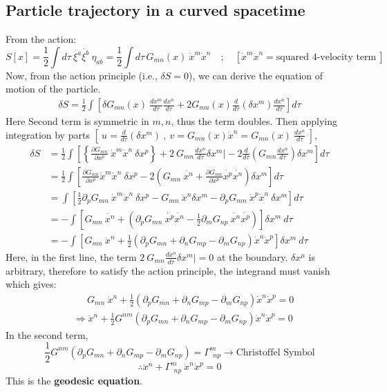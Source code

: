 \documentclass[14pt]{article} %
\begin{document}
\subsection{Particle trajectory in a curved spacetime}
From the action:
\[
S[x] = \frac{1}{2} \int d\tau ~\dot{\xi^a}\dot{\xi^b}~ \eta_{ab}
= \frac{1}{2} \int d\tau\, G_{mn}(x) ~\dot{x}^m \dot{x}^n
\quad;\quad [\dot{x}^m \dot{x}^n =\text{squared 4-velocity term} ~]
\]
\noindent
Now, from the action principle (i.e., $\delta S = 0$), we can derive the equation of motion of the particle.
\begin{align*}
\delta S = \frac{1}{2} \int \left[ \delta G_{mn}(x)~ \frac{dx^m}{d \tau} \frac{dx^n}{d \tau} + 2 G_{mn}(x) \frac{d}{d\tau} (\delta x^m) \frac{dx^n}{d \tau} \right] d\tau
\end{align*}
Here Second term is symmetric in $m,n$, thus the term doubles. Then applying integration by parts $\left[~ u=\frac{d}{d\tau} (\delta x^m)~,~v=G_{mn}(x) \dot{x}^n=G_{mn}(x) ~\frac{dx^n}{d\tau} ~\right]$,
\begin{align*}
\delta S &= \frac{1}{2} \int \left[ \left\{\frac{\partial G_{mn}}{\partial x^p}~\dot{x}^m \dot{x}^n~\delta x^p \right\} + 2~G_{mn} \frac{dx^n}{d\tau} \delta x^m\Bigg| -2 \frac{d}{d\tau}\left(G_{mn}\frac{dx^n}{d\tau}\right)\delta x^m \right] d\tau \\
&= \frac{1}{2} \int \left[ \frac{\partial G_{mn}}{\partial x^p} \dot{x}^m \dot{x}^n~\delta x^p -2 \left(G_{mn}~\ddot{x^n}+\frac{\partial G_{mn}}{\partial x^p} \dot{x^p}\dot{x^n}  \right)\delta x^m \right] d\tau \\
&= \int \left[ \frac{1}{2}\partial_p G_{mn}~\dot{x}^m \dot{x}^n~\delta x^p - G_{mn}~\ddot{x}^n \delta x^m - \partial_p G_{mn}~\dot{x}^p \dot{x}^n~\delta x^m  \right] d\tau \\
&= -\int \left[ G_{mn}~\ddot{x^n} + \left( \partial_p G_{mn}~\dot{x^p}\dot{x^n} - \frac{1}{2}\partial_m G_{np}~\dot{x^n} \dot{x^p} \right) \right] \delta x^m~d\tau  \\
&= - \int \left[ G_{mn}~\ddot{x}^n + \frac{1}{2} \left( \partial_p G_{mn} + \partial_n G_{mp} - \partial_m G_{np} \right) \dot{x}^n \dot{x}^p \right] \delta x^m~d \tau
\end{align*}
Here, in the first line, the term $2~G_{mn} \frac{dx^n}{d\tau} \delta x^m\Bigg|=0$ at the boundary. $\delta x^\mu$ is arbitrary, therefore to satisfy the action principle, the integrand must vanish which gives:
\begin{align*}
&\quad ~~ G_{mn}~\ddot{x}^n + \frac{1}{2} \left( \partial_p G_{mn} + \partial_n G_{mp} - \partial_m G_{np} \right) \dot{x}^n \dot{x}^p = 0 \\
& \Rightarrow \ddot{x}^n + \frac{1}{2}G^{nm} \left( \partial_p G_{mn} + \partial_n G_{mp} - \partial_m G_{np} \right) \dot{x}^n \dot{x}^p = 0
\end{align*}
In the second term,
\[
\frac{1}{2}G^{nm} \left( \partial_p G_{mn} + \partial_n G_{mp} - \partial_m G_{np} \right) = \Gamma^m_{~~np} \rightarrow \text{Christoffel Symbol}
\]
\[
\boxed{\therefore \ddot{x}^n + \Gamma^m_{~~np}~ \dot{x}^n \dot{x}^p = 0}
\]
This is the \textbf{geodesic equation}.\\
\end{document}
